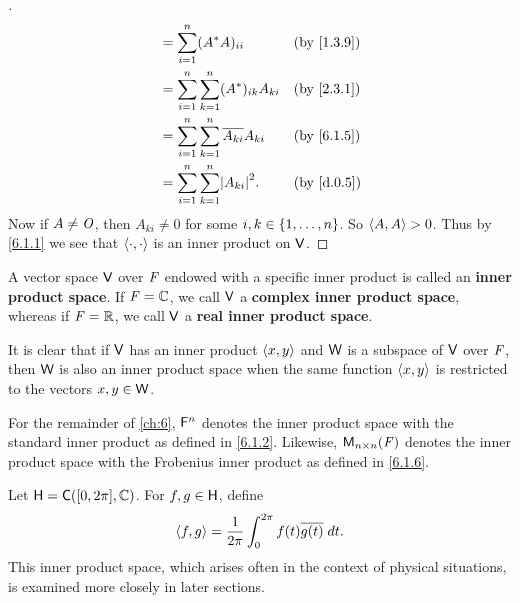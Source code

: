 \begin{proof}[]
\begin{align*}
		           & = \sum_{i = 1}^n (A^* A)_{i i}                         &  & \by{1.3.9} \\
		           & = \sum_{i = 1}^n \sum_{k = 1}^n (A^*)_{i k} A_{k i}    &  & \by{2.3.1} \\
		           & = \sum_{i = 1}^n \sum_{k = 1}^n \conj{A_{k i}} A_{k i} &  & \by{6.1.5} \\
		           & = \sum_{i = 1}^n \sum_{k = 1}^n \abs{A_{k i}}^2.       &  & \by{d.0.5}
	\end{align*}
	Now if \(A \neq \mathit{O}\), then \(A_{k i} \neq 0\) for some \(i, k \in \left\lbrace1, \dots, n\right\rbrace\).
	So \(\left\langle A, A\right\rangle > 0\).
	Thus by \cref{6.1.1} we see that \(\left\langle\cdot, \cdot\right\rangle\) is an inner product on \(\mathsf{V}\).
\end{proof}

\begin{defn}\label{6.1.7}
	A vector space \(\mathsf{V}\) over \(\mathit{F}\) endowed with a specific inner product is called an \textbf{inner product space}.
	If \(\mathit{F} = \mathbb{C}\), we call \(\mathsf{V}\) a \textbf{complex inner product space}, whereas if \(\mathit{F} = \mathbb{R}\), we call \(\mathsf{V}\) a \textbf{real inner product space}.

	It is clear that if \(\mathsf{V}\) has an inner product \(\left\langle x, y\right\rangle\) and \(\mathsf{W}\) is a subspace of \(\mathsf{V}\) over \(\mathit{F}\), then \(\mathsf{W}\) is also an inner product space when the same function \(\left\langle x, y\right\rangle\) is restricted to the vectors \(x, y \in \mathsf{W}\).
\end{defn}

\begin{note}
	For the remainder of \cref{ch:6}, \(\mathsf{F}^n\) denotes the inner product space with the standard inner product as defined in \cref{6.1.2}.
	Likewise, \(\mathsf{M}_{{n} \times n}({\mathit{F}})\) denotes the inner product space with the Frobenius inner product as defined in \cref{6.1.6}.
\end{note}

\begin{eg}\label{6.1.8}
	Let \(\vs{H} = \cfs([0, 2 \pi], \C)\).
	For \(f, g \in \mathsf{H}\), define
	\[
		\left\langle f, g\right\rangle = \frac{1}{2 \pi} \int_0^{2 \pi} f(t) \overline{g(t)} \; dt.
	\]
	This inner product space, which arises often in the context of physical situations, is examined more closely in later sections.
\end{eg}

